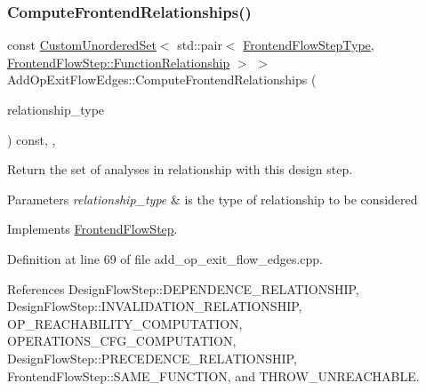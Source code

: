 \subsubsection{\texorpdfstring{Compute\+Frontend\+Relationships()}{ComputeFrontendRelationships()}}
{\footnotesize\ttfamily const \hyperlink{classCustomUnorderedSet}{Custom\+Unordered\+Set}$<$ std\+::pair$<$ \hyperlink{frontend__flow__step_8hpp_afeb3716c693d2b2e4ed3e6d04c3b63bb}{Frontend\+Flow\+Step\+Type}, \hyperlink{classFrontendFlowStep_af7cf30f2023e5b99e637dc2058289ab0}{Frontend\+Flow\+Step\+::\+Function\+Relationship} $>$ $>$ Add\+Op\+Exit\+Flow\+Edges\+::\+Compute\+Frontend\+Relationships (\begin{DoxyParamCaption}\item[{const \hyperlink{classDesignFlowStep_a723a3baf19ff2ceb77bc13e099d0b1b7}{Design\+Flow\+Step\+::\+Relationship\+Type}}]{relationship\+\_\+type }\end{DoxyParamCaption}) const\hspace{0.3cm}{\ttfamily [override]}, {\ttfamily [private]}, {\ttfamily [virtual]}}



Return the set of analyses in relationship with this design step. 


\begin{DoxyParams}{Parameters}
{\em relationship\+\_\+type} & is the type of relationship to be considered \\
\hline
\end{DoxyParams}


Implements \hyperlink{classFrontendFlowStep_abeaff70b59734e462d347ed343dd700d}{Frontend\+Flow\+Step}.



Definition at line 69 of file add\+\_\+op\+\_\+exit\+\_\+flow\+\_\+edges.\+cpp.



References Design\+Flow\+Step\+::\+D\+E\+P\+E\+N\+D\+E\+N\+C\+E\+\_\+\+R\+E\+L\+A\+T\+I\+O\+N\+S\+H\+IP, Design\+Flow\+Step\+::\+I\+N\+V\+A\+L\+I\+D\+A\+T\+I\+O\+N\+\_\+\+R\+E\+L\+A\+T\+I\+O\+N\+S\+H\+IP, O\+P\+\_\+\+R\+E\+A\+C\+H\+A\+B\+I\+L\+I\+T\+Y\+\_\+\+C\+O\+M\+P\+U\+T\+A\+T\+I\+ON, O\+P\+E\+R\+A\+T\+I\+O\+N\+S\+\_\+\+C\+F\+G\+\_\+\+C\+O\+M\+P\+U\+T\+A\+T\+I\+ON, Design\+Flow\+Step\+::\+P\+R\+E\+C\+E\+D\+E\+N\+C\+E\+\_\+\+R\+E\+L\+A\+T\+I\+O\+N\+S\+H\+IP, Frontend\+Flow\+Step\+::\+S\+A\+M\+E\+\_\+\+F\+U\+N\+C\+T\+I\+ON, and T\+H\+R\+O\+W\+\_\+\+U\+N\+R\+E\+A\+C\+H\+A\+B\+LE.

\mbox{\label{classAddOpExitFlowEdges_a62e837ee9c075439de0fbe4155c32de0}} 
